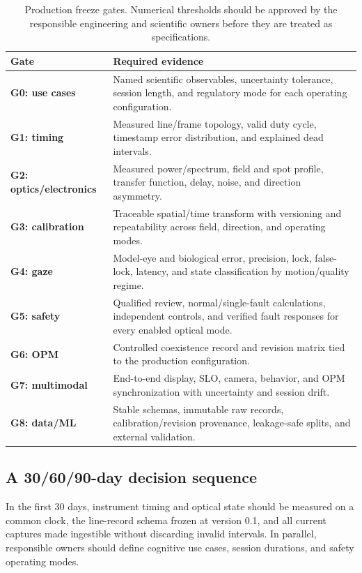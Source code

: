 \documentclass[11pt]{article}
\begin{document}
\begin{table}[ht]
\centering
\caption{Production freeze gates. Numerical thresholds should be approved by the responsible
engineering and scientific owners before they are treated as specifications.}
\begin{tabularx}{\textwidth}{>{\bfseries}p{} X}
\toprule
Gate & Required evidence\\
\midrule
G0: use cases & Named scientific observables, uncertainty tolerance, session length, and regulatory
mode for each operating configuration.\\
G1: timing & Measured line/frame topology, valid duty cycle, timestamp error distribution, and
explained dead intervals.\\
G2: optics/electronics & Measured power/spectrum, field and spot profile, transfer function, delay,
noise, and direction asymmetry.\\
G3: calibration & Traceable spatial/time transform with versioning and repeatability across field,
direction, and operating modes.\\
G4: gaze & Model-eye and biological error, precision, lock, false-lock, latency, and state
classification by motion/quality regime.\\
G5: safety & Qualified review, normal/single-fault calculations, independent controls, and verified
fault responses for every enabled optical mode.\\
G6: OPM & Controlled coexistence record and revision matrix tied to the production configuration.\\
G7: multimodal & End-to-end display, SLO, camera, behavior, and OPM synchronization with uncertainty
and session drift.\\
G8: data/ML & Stable schemas, immutable raw records, calibration/revision provenance, leakage-safe
splits, and external validation.\\
\bottomrule
\end{tabularx}
\end{table}

\subsection{A 30/60/90-day decision sequence}

In the first 30 days, instrument timing and optical state should be measured on a common clock, the
line-record schema frozen at version 0.1, and all current captures made ingestible without
discarding invalid intervals. In parallel, responsible owners should define cognitive use cases,
session durations, and safety operating modes.
\end{document}
